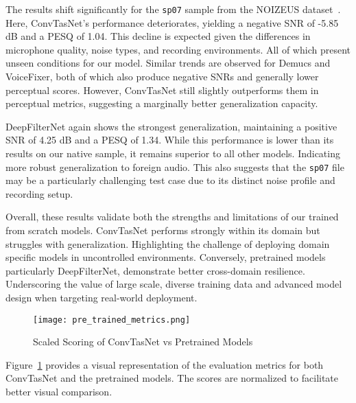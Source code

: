 The results shift significantly for the \texttt{sp07} sample from the NOIZEUS dataset~\cite{hu2007subjective}. Here, ConvTasNet's performance deteriorates, yielding a negative SNR of -5.85 dB and a PESQ of 1.04. This decline is expected given the differences in microphone quality, noise types, and recording environments. All of which present unseen conditions for our model. Similar trends are observed for Demucs and VoiceFixer, both of which also produce negative SNRs and generally lower perceptual scores. However, ConvTasNet still slightly outperforms them in perceptual metrics, suggesting a marginally better generalization capacity.

DeepFilterNet again shows the strongest generalization, maintaining a positive SNR of 4.25 dB and a PESQ of 1.34. While this performance is lower than its results on our native sample, it remains superior to all other models. Indicating more robust generalization to foreign audio. This also suggests that the \texttt{sp07} file may be a particularly challenging test case due to its distinct noise profile and recording setup.

Overall, these results validate both the strengths and limitations of our trained from scratch models. ConvTasNet performs strongly within its domain but struggles with generalization. Highlighting the challenge of deploying domain specific models in uncontrolled environments. Conversely, pretrained models particularly DeepFilterNet, demonstrate better cross-domain resilience. Underscoring the value of large scale, diverse training data and advanced model design when targeting real-world deployment.

\begin{figure}[H]
\centering
\texttt{[image: pre\_trained\_metrics.png]}
\caption{Scaled Scoring of ConvTasNet vs Pretrained Models}
\label{fig:pretrained_metrics}
\end{figure}
\noindent

Figure~\ref{fig:pretrained_metrics} provides a visual representation of the evaluation metrics for both ConvTasNet and the pretrained models. The scores are normalized to facilitate better visual comparison.

